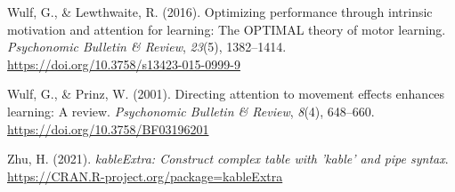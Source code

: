 \documentclass[
  man, donotrepeattitle,floatsintext]{apa7}
\newlength{\cslhangindent}
\newlength{\cslentryspacingunit} %
\newenvironment{CSLReferences}[2] %
 {%
  \setlength{\parindent}{0pt}
  \ifodd #1
  \let\oldpar\par
  \def\par{\hangindent=\cslhangindent\oldpar}
  \fi
  \setlength{\parskip}{#2\cslentryspacingunit}
 }%
 {}
\begin{document}
\begin{CSLReferences}{1}{0}
\leavevmode{}%
Wulf, G., \& Lewthwaite, R. (2016). Optimizing performance through intrinsic motivation and attention for learning: {The OPTIMAL} theory of motor learning. \emph{Psychonomic Bulletin \& Review}, \emph{23}(5), 1382--1414. \url{https://doi.org/10.3758/s13423-015-0999-9}

\leavevmode{}%
Wulf, G., \& Prinz, W. (2001). Directing attention to movement effects enhances learning: {A} review. \emph{Psychonomic Bulletin \& Review}, \emph{8}(4), 648--660. \url{https://doi.org/10.3758/BF03196201}

\leavevmode{}%
Zhu, H. (2021). \emph{kableExtra: Construct complex table with 'kable' and pipe syntax}. \url{https://CRAN.R-project.org/package=kableExtra}

\end{CSLReferences}
\end{document}
